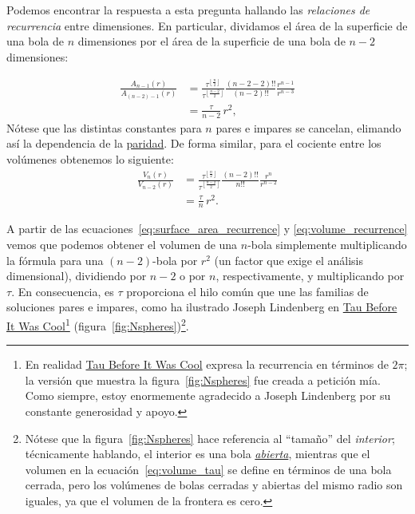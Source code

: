 Podemos encontrar la respuesta a esta pregunta hallando las \emph{relaciones de recurrencia} entre dimensiones. En particular, dividamos el área de la superficie de una bola de $n$ dimensiones por el área de la superficie de una bola de $n-2$ dimensiones:

\begin{equation}
  \label{eq:surface_area_recurrence}
  \begin{split}
  \frac{A_{n-1}(r)}{A_{(n-2)-1}(r)} & =
  \frac{\tau^{\left\lfloor \frac{n}{2} \right\rfloor}}{\tau^{\left\lfloor \frac{n-2}{2} \right\rfloor}}
  \frac{(n-2-2)!!}{(n-2)!!}
  \frac{r^{n-1}}{r^{n-3}}
  \\ & = \frac{\tau}{n-2}\,r^2,
  \end{split}
\end{equation}
Nótese que las distintas constantes para $n$ pares e impares se cancelan, elimando así la dependencia de la \href{https://es.wikipedia.org/wiki/N%C3%BAmeros_pares_e_impares}{paridad}. De forma similar, para el cociente entre los volúmenes obtenemos lo siguiente:
\begin{equation}
\label{eq:volume_recurrence}
\begin{split}
\frac{V_n(r)}{V_{n-2}(r)} & =
\frac{\tau^{\left\lfloor \frac{n}{2} \right\rfloor}}{\tau^{\left\lfloor \frac{n-2}{2} \right\rfloor}}
\frac{(n-2)!!}{n!!}
\frac{r^{n}}{r^{n-2}}
\\ & = \frac{\tau}{n}\,r^2.
\end{split}
\end{equation}

A partir de las ecuaciones~\eqref{eq:surface_area_recurrence} y \eqref{eq:volume_recurrence} vemos que podemos obtener el volumen de una $n$-bola simplemente multiplicando la fórmula para una $(n-2)$-bola por $r^2$ (un factor que exige el análisis dimensional), dividiendo por $n-2$ o por $n$, respectivamente, y multiplicando por $\tau$. En consecuencia, es $\tau$ proporciona el hilo común que une las familias de soluciones pares e impares, como ha ilustrado Joseph Lindenberg en \href{http://sites.google.com/site/taubeforeitwascool/}{Tau Before It Was Cool}\footnote{En realidad \href{https://sites.google.com/site/taubeforeitwascool/}{Tau Before It Was Cool} expresa la recurrencia en términos de $2\pi$; la versión que muestra la figura~\ref{fig:Nspheres} fue creada a petición mía. Como siempre, estoy enormemente agradecido a Joseph Lindenberg por su constante generosidad y apoyo.} (figura~\ref{fig:Nspheres})\footnote{Nótese que la figura~\ref{fig:Nspheres} hace referencia al ``tamaño'' del \emph{interior}; técnicamente hablando, el interior es una bola \href{https://es.wikipedia.org/wiki/Conjunto_abierto}{\emph{abierta}}, mientras que el volumen en la ecuación~\eqref{eq:volume_tau} se define en términos de una bola cerrada, pero los volúmenes de bolas cerradas y abiertas del mismo radio son iguales, ya que el volumen de la frontera es cero.}.

